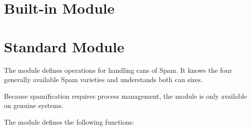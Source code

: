 


\section{Built-in Module }	%

\section{Standard Module }	%

\label{module-spam}


The  module defines operations for handling cans of Spam.
It knows the four generally available Spam varieties and understands
both can sizes.

Because spamification requires \UNIX{} process management, the module
is only available on genuine \UNIX{} systems.



The  module defines the following functions:



